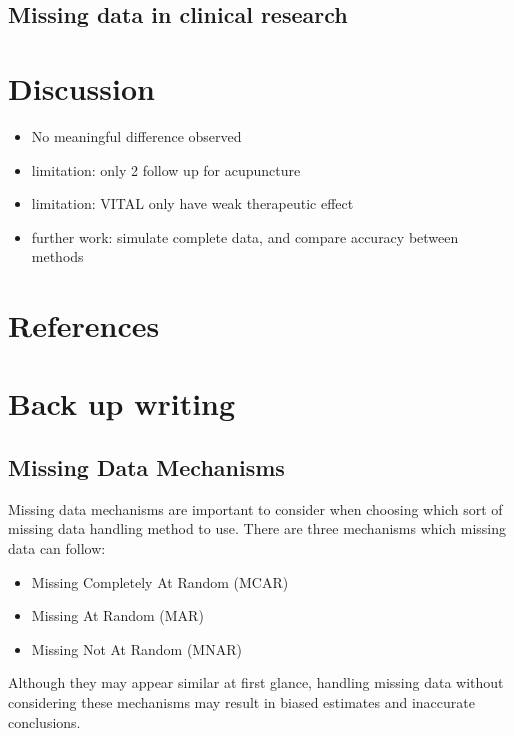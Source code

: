 \documentclass{article}
\providecommand{\tightlist}{%
  \setlength{\itemsep}{0pt}\setlength{\parskip}{0pt}}
\begin{document}
\subsection{Missing data in clinical
research}\label{missing-data-in-clinical-research}

\section{Discussion}\label{discussion}

\begin{itemize}
\tightlist
\item
  No meaningful difference observed
\item
  limitation: only 2 follow up for acupuncture
\item
  limitation: VITAL only have weak therapeutic effect
\item
  further work: simulate complete data, and compare accuracy between
  methods
\end{itemize}

\section{References}\label{references}

\section{Back up writing}\label{back-up-writing}

\subsection{Missing Data Mechanisms}\label{missing-data-mechanisms}

Missing data mechanisms are important to consider when choosing which
sort of missing data handling method to use. There are three mechanisms
which missing data can follow:

\begin{itemize}
\tightlist
\item
  Missing Completely At Random (MCAR)
\item
  Missing At Random (MAR)
\item
  Missing Not At Random (MNAR)
\end{itemize}

Although they may appear similar at first glance, handling missing data
without considering these mechanisms may result in biased estimates and
inaccurate conclusions.
\end{document}
